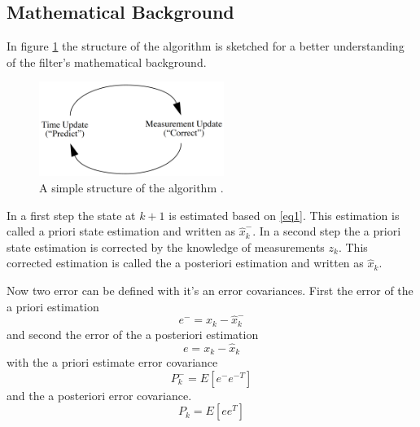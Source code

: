 \subsection*{Mathematical Background}\label{math_kalman}
In figure \ref{simple_schematic} the structure of the algorithm is sketched for a better understanding of the filter's mathematical background. 
\begin{figure}[h]
\begin{center}
\includegraphics[width=6cm]{pictures/simple_schematic_algo.png}
\caption{A simple structure of the algorithm \cite{welch1997}.}
\label{simple_schematic}
\end{center}
\end{figure}
In a first step the state at $k+1$ is estimated based on \ref{eq1}. This estimation is called a priori state estimation and written as $\hat{x}_k^{-}$. In a second step the a priori state estimation is corrected by the knowledge of measurements $z_k$. This corrected estimation is called the a posteriori estimation and written as $\hat{x}_k$.

Now two error can be defined with it's an error covariances. First the error of the a priori estimation 
\begin{equation}
e^{-}=x_k-\hat{x}_k^{-}
\end{equation}
and second the error of the a posteriori estimation 
\begin{equation}
e=x_k-\hat{x}_k
\end{equation}
with the a priori estimate error covariance 
\begin{equation}
P^{-}_k=E[e^{-}e^{-T}]
\end{equation}
and the a posteriori error covariance.
\begin{equation}
P_k=E[ee^{T}]\label{P_post}
\end{equation}

